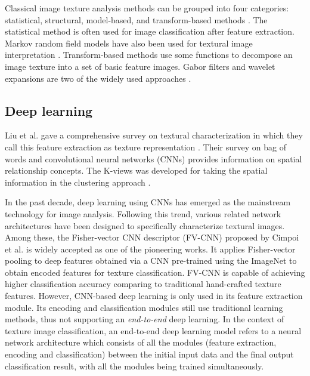 \documentclass{aci}
\numberwithin{equation}{section}
\begin{document}
Classical image texture analysis methods can be grouped into four categories:
statistical, structural, model-based, and transform-based methods
\cite{bharati_image_2004}. The statistical method is often used for image
classification after feature extraction. Markov random field models have also
been used for textural image interpretation \cite{hassner_use_1981,
    cross_markov_1983}. Transform-based methods use some functions to decompose an
image texture into a set of basic feature images. Gabor filters and wavelet
expansions are two of the widely used approaches \cite{bovik_multichannel_1990}.


\subsection{Deep learning}

Liu et al. gave a comprehensive survey on textural characterization in which
they call this feature extraction as texture representation \cite{liu_bow_2019}.
Their survey on bag of words and convolutional neural networks (CNNs)
\cite{krizhevsky_imagenet_2017} provides information on spatial relationship
concepts. The K-views was developed for taking the spatial information in the
clustering approach \cite{hung_image_2019}.

In the past decade, deep learning using CNNs has emerged as the mainstream
technology for image analysis. Following this trend, various related network
architectures have been designed to specifically characterize textural images.
Among these, the Fisher-vector CNN descriptor (FV-CNN) proposed by Cimpoi et al.
\cite{cimpoi_deep_2015} is widely accepted as one of the pioneering works. It
applies Fisher-vector pooling to deep features obtained via a CNN pre-trained
using the ImageNet \cite{krizhevsky_imagenet_2017} to obtain encoded features
for texture classification. FV-CNN is capable of achieving higher classification
accuracy comparing to traditional hand-crafted texture features. However,
CNN-based deep learning is only used in its feature extraction module. Its
encoding and classification modules still use traditional learning methods, thus
not supporting an \textit{end-to-end} deep learning. In the context of texture
image classification, an end-to-end deep learning model refers to a neural
network architecture which consists of all the modules (feature extraction,
encoding and classification) between the initial input data and the final output
classification result, with all the modules being trained simultaneously.
\end{document}
